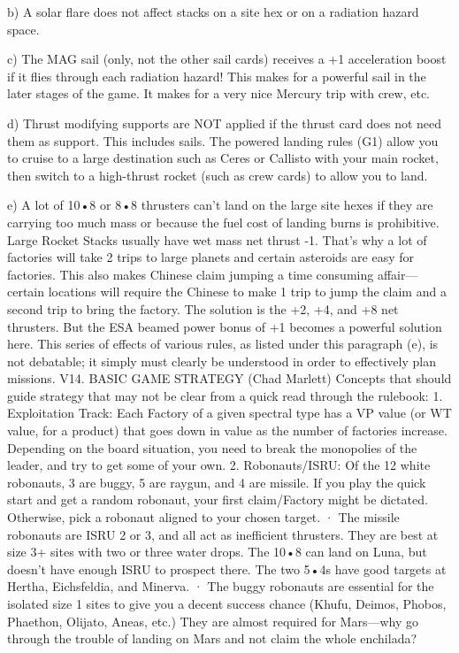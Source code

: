 \documentclass[a4paper]{book}
\begin{document}
b) A solar flare does not affect stacks on a site hex or on a radiation hazard space.

c) The MAG sail (only, not the other sail cards) receives a +1 acceleration boost if it flies through each radiation hazard! This makes for a powerful sail in the later stages of the game. It makes for a very nice Mercury trip with crew, etc.

d) Thrust modifying supports are NOT applied if the thrust card does not need them as support. This includes sails. The powered landing rules (G1) allow you to cruise to a large destination such as Ceres or Callisto with your main rocket, then switch to a high-thrust rocket (such as crew cards) to allow you to land.

e) A lot of 10•8 or 8•8 thrusters can't land on the large site hexes if they are carrying too much mass or because the fuel cost of landing burns is prohibitive. Large Rocket Stacks usually have wet mass net thrust -1. That's why a lot of factories will take 2 trips to large planets and certain asteroids are easy for factories.
This also makes Chinese claim jumping a time consuming affair—certain locations will require the Chinese to make 1 trip to jump the claim and a second trip to bring the factory. The solution is the +2, +4, and +8 net thrusters. But the ESA beamed power bonus of +1 becomes a powerful solution here. This series of effects of various rules, as listed under this paragraph (e), is not debatable; it simply must clearly be understood in order to effectively plan missions.
V14. BASIC GAME STRATEGY (Chad Marlett)
Concepts that should guide strategy that may not be clear from a quick read through the rulebook:
1. Exploitation Track: Each Factory of a given spectral type has a VP value (or WT value, for a product) that goes down in value as the number of factories increase. Depending on the board situation, you need to break the monopolies of the leader, and try to get some of your own.
2. Robonauts/ISRU: Of the 12 white robonauts, 3 are buggy, 5 are raygun, and 4 are missile. If you play the quick start and get a random robonaut, your first claim/Factory might be dictated. Otherwise, pick a robonaut aligned to your chosen target.
·       The missile robonauts are ISRU 2 or 3, and all act as inefficient thrusters. They are best at size 3+ sites with two or three water drops. The 10•8 can land on Luna, but doesn't have enough ISRU to prospect there. The two 5•4s have good targets at Hertha, Eichsfeldia, and Minerva.
·       The buggy robonauts are essential for the isolated size 1 sites to give you a decent success chance (Khufu, Deimos, Phobos, Phaethon, Olijato, Aneas, etc.) They are almost required for Mars—why go through the trouble of landing on Mars and not claim the whole enchilada?
\end{document}
